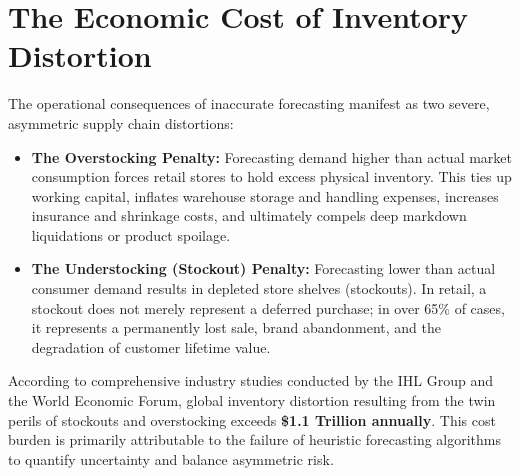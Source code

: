 \documentclass[12pt,a4paper,oneside]{report}
\theoremstyle{definition}
\begin{document}
\section{The Economic Cost of Inventory Distortion}
The operational consequences of inaccurate forecasting manifest as two severe, asymmetric supply chain distortions:
\begin{itemize}[itemsep=0.25cm]
    \item \textbf{The Overstocking Penalty:} Forecasting demand higher than actual market consumption forces retail stores to hold excess physical inventory. This ties up working capital, inflates warehouse storage and handling expenses, increases insurance and shrinkage costs, and ultimately compels deep markdown liquidations or product spoilage.
    \item \textbf{The Understocking (Stockout) Penalty:} Forecasting lower than actual consumer demand results in depleted store shelves (stockouts). In retail, a stockout does not merely represent a deferred purchase; in over 65\% of cases, it represents a permanently lost sale, brand abandonment, and the degradation of customer lifetime value.
\end{itemize}
According to comprehensive industry studies conducted by the IHL Group and the World Economic Forum, global inventory distortion resulting from the twin perils of stockouts and overstocking exceeds \textbf{\$1.1 Trillion annually}. This cost burden is primarily attributable to the failure of heuristic forecasting algorithms to quantify uncertainty and balance asymmetric risk.
\end{document}

